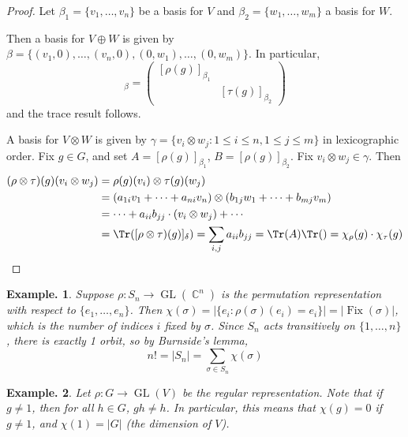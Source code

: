 \documentclass[11pt, a4paper]{memoir}
\DeclareMathOperator{\C}{{\mathbb{C}}}
\theoremstyle{change}
\theoremstyle{plain}
\theoremstyle{nonumberplain}
\newtheorem{example}{Example.}
\newtheorem{proof}{Proof}
\DeclareMathOperator{\Fix}{Fix}
\DeclareMathOperator{\GL}{GL}
\numberwithin{equation}{section}
\begin{document}
\begin{proof}
    Let $\beta_1=\{v_1,\ldots,v_n\}$ be a basis for $V$ and $\beta_2=\{w_1,\ldots,w_m\}$ a basis for $W$.

    Then a basis for $V\oplus W$ is given by $\beta=\{(v_1,0),\ldots,(v_n,0),(0,w_1),\ldots,(0,w_m)\}$.
    In particular,
    \begin{equation*}
        [(\rho\oplus\tau)(g)]_\beta=
        \begin{pmatrix}
            [\rho(g)]_{\beta_1} & \\
                                & [\tau(g)]_{\beta_2}
        \end{pmatrix}
    \end{equation*}
    and the trace result follows.

    A basis for $V\otimes W$ is given by $\gamma=\{v_i\otimes w_j:1\leq i\leq n,1\leq j\leq m\}$ in lexicographic order.
    Fix $g\in G$, and set $A=[\rho(g)]_{\beta_1}$, $B=[\rho(g)]_{\beta_2}$.
    Fix $v_i\otimes w_j\in\gamma$.
    Then
    \begin{align*}
        (\rho\otimes\tau)(g)(v_i\otimes w_j)&=\rho(g)(v_i)\otimes\tau(g)(w_j)\\
                                            &= (a_{1i}v_1+\cdots+a_{ni}v_n)\otimes(b_{1j}w_1+\cdots+b_{mj}v_m)\\
                                            &= \cdots+a_{ii}b_{jj}\cdot(v_i\otimes w_j)+\cdots\\
                                            &= \Tr([\rho\otimes\tau)(g)]_\delta)=\sum_{i,j}a_{ii}b_{jj}=\Tr(A)\Tr()=\chi_\rho(g)\cdot\chi_\tau(g)
    \end{align*}
\end{proof}
\begin{example}
    Suppose $\rho:S_n\to\GL(\C^n)$ is the permutation representation with respect to $\{e_1,\ldots,e_n\}$.
    Then $\chi(\sigma)=|\{e_i:\rho(\sigma)(e_i)=e_i\}|=|\Fix(\sigma)|$, which is the number of indices $i$ fixed by $\sigma$.
    Since $S_n$ acts transitively on $\{1,\ldots,n\}$, there is exactly 1 orbit, so by Burnside's lemma,
    \begin{equation*}
        n!=|S_n| = \sum_{\sigma\in S_n}\chi(\sigma)
    \end{equation*}
\end{example}
\begin{example}
    Let $\rho:G\to\GL(V)$ be the regular representation.
    Note that if $g\neq 1$, then for all $h\in G$, $gh\neq h$.
    In particular, this means that $\chi(g)=0$ if $g\neq 1$, and $\chi(1)=|G|$ (the dimension of $V$).
\end{example}
\end{document}
